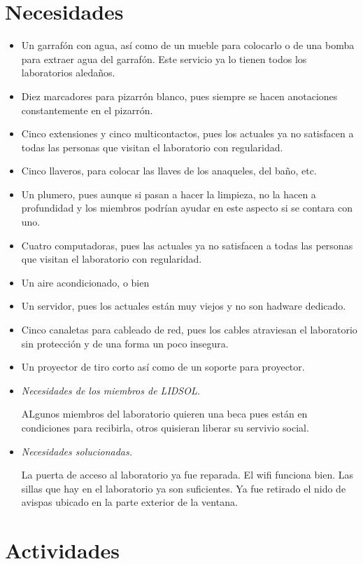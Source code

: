 \documentclass[a4paper,11pt]{article}                 %
\begin{document}
  \section{Necesidades}
  \begin{itemize}
    \item Un garrafón con agua, así como de un mueble para colocarlo o de una bomba para extraer agua del garrafón. Este servicio ya lo tienen todos los laboratorios aledaños.
    \item Diez marcadores para pizarrón blanco, pues siempre se hacen anotaciones constantemente en el pizarrón. 
    \item Cinco extensiones y cinco multicontactos, pues los actuales ya no satisfacen a todas las personas que visitan el laboratorio con regularidad.
    \item Cinco llaveros, para colocar las llaves de los anaqueles, del baño, etc.
    \item Un plumero, pues aunque si pasan a hacer la limpieza, no la hacen a profundidad y los miembros podrían ayudar en este aspecto si se contara con uno.
    \item Cuatro computadoras, pues las actuales ya no satisfacen a todas las personas que visitan el laboratorio con regularidad.
    \item Un aire acondicionado, o bien 
    \item Un servidor, pues los actuales están muy viejos y no son hadware dedicado.
    \item Cinco canaletas para cableado de red, pues los cables atraviesan el laboratorio sin protección y de una forma un poco insegura.
    \item Un proyector de tiro corto así como de un soporte para proyector.
    \item \textit{Necesidades de los miembros de LIDSOL.}

    ALgunos miembros del laboratorio quieren una beca pues están en condiciones para recibirla, otros quisieran liberar su servivio social.

    \item \textit{Necesidades solucionadas.}

    La puerta de acceso al laboratorio ya fue reparada. El wifi funciona bien. Las sillas que hay en el laboratorio ya son suficientes. Ya fue retirado el nido de avispas ubicado en la parte exterior de la ventana.

  \end{itemize}
  \section{Actividades}
  
  
  
  
   
  


\end{document}
